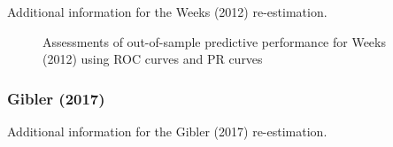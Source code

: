 Additional information for the Weeks (2012) re-estimation. 


\FloatBarrier

\begin{figure}
\centering   
  \caption{Assessments of out-of-sample predictive performance for Weeks (2012) using ROC curves and PR curves}
\end{figure}
\FloatBarrier
\clearpage

\subsubsection*{Gibler (2017)}

Additional information for the Gibler (2017) re-estimation. 


\FloatBarrier

